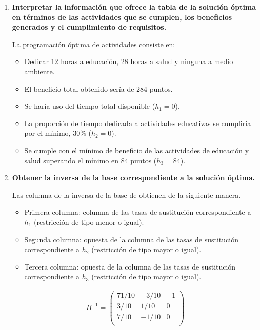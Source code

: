 \begin{enumerate}
    \item \textbf{Interpretar la información que ofrece la tabla de la solución óptima en términos de las actividades que se cumplen, los beneficios generados y el cumplimiento de requisitos.}

    La programación óptima de actividades consiste en:
    \begin{itemize}
        \item Dedicar 12 horas a educación, 28 horas a salud y ninguna a medio ambiente.
        \item El beneficio total obtenido sería de 284 puntos.
        \item Se haría uso del tiempo total disponible ($h_1=0$).
        \item La proporción de tiempo dedicada a actividades educativas se cumpliría por el mínimo, 30\% ($h_2=0$).
        \item Se cumple con el mínimo de beneficio de las actividades de educación y salud superando el mínimo en 84 puntos ($h_3=84$).
    \end{itemize}

    \item \textbf{Obtener la inversa de la base correspondiente a la solución óptima.}

    Las columna de la inversa de la base de obtienen de la siguiente manera.
    \begin{itemize}
        \item Primera columna: columna de las tasas de sustitución correspondiente a $h_1$ (restricción de tipo menor o igual).
        \item Segunda columna: opuesta de la columna de las tasas de sustitución correspondiente a $h_2$ (restricción de tipo mayor o igual).
        \item Tercera columna: opuesta de la columna de las tasas de sustitución correspondiente a $h_3$ (restricción de tipo mayor o igual).
    \end{itemize}

\begin{equation}
\begin{split}
B^{-1} =\begin{pmatrix}
71/10 & -3/10 & -1\\
3/10 & 1/10 & 0\\
7/10 & -1/10 & 0\\
\end{pmatrix}
\end{split}
\end{equation}
    

\end{enumerate}
